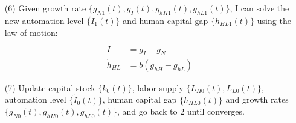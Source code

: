\documentclass[12pt]{article}
\begin{document}
\begin{appendices}
\begin{itemize}
\item[(6)] Given growth rate $\{g_{N1}(t),g_I(t),g_{hH1}(t),g_{hL1}(t)\}$, I can solve the new automation level $\{\tilde{I}_1(t)\}$ and human capital gap $\{h_{HL1}(t)\}$ using the law of motion: 
\begin{align*}
\dot{\tilde{I}} &= g_I- g_N \\
\dot{h}_{HL} &= b (g_{hH}-g_{hL})
\end{align*}

\item[(7)] Update capital stock $\{k_0(t)\}$, labor supply $\{L_{H0}(t), L_{L0}(t)\}$, automation level $\{\tilde{I}_0(t)\}$, human capital gap $\{h_{HL0}(t)\}$ and growth rates $\{g_{N0}(t),g_{hH0}(t),g_{hL0}(t)\}$, and go back to 2 until converges. 

\end{itemize}
\end{appendices}
\end{document}
